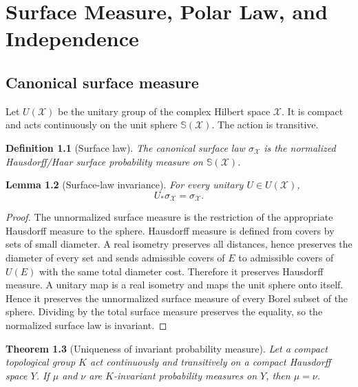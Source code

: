 \documentclass[11pt,oneside]{book}
\newtheorem{theorem}{Theorem}[chapter]
\newtheorem{lemma}[theorem]{Lemma}
\newtheorem{definition}[theorem]{Definition}
\newcommand{\1}{\mathbf 1}
\newcommand{\Sphere}{\mathbb S}
\begin{document}
\chapter{Surface Measure, Polar Law, and Independence}

\section{Canonical surface measure}

Let \(U(\mathcal X)\) be the unitary group of the complex Hilbert space
\(\mathcal X\).  It is compact and acts continuously on the unit sphere
\(\Sphere(\mathcal X)\).  The action is transitive.

\begin{definition}[Surface law]
The canonical surface law \(\sigma_{\mathcal X}\) is the normalized
Hausdorff/Haar surface probability measure on \(\Sphere(\mathcal X)\).
\end{definition}

\begin{lemma}[Surface-law invariance]
For every unitary \(U\in U(\mathcal X)\),
\[
  U_*\sigma_{\mathcal X}=\sigma_{\mathcal X}.
\]
\end{lemma}

\begin{proof}
The unnormalized surface measure is the restriction of the appropriate
Hausdorff measure to the sphere.  Hausdorff measure is defined from covers by
sets of small diameter.  A real isometry preserves all distances, hence
preserves the diameter of every set and sends admissible covers of \(E\) to
admissible covers of \(U(E)\) with the same total diameter cost.  Therefore it
preserves Hausdorff measure.  A unitary map is a real isometry and maps the
unit sphere onto itself.  Hence it preserves the unnormalized surface measure
of every Borel subset of the sphere.  Dividing by the total surface measure
preserves the equality, so the normalized surface law is invariant.
\end{proof}

\begin{theorem}[Uniqueness of invariant probability measure]
Let a compact topological group \(K\) act continuously and transitively on a
compact Hausdorff space \(Y\).  If \(\mu\) and \(\nu\) are \(K\)-invariant
probability measures on \(Y\), then \(\mu=\nu\).
\end{theorem}
\end{document}

